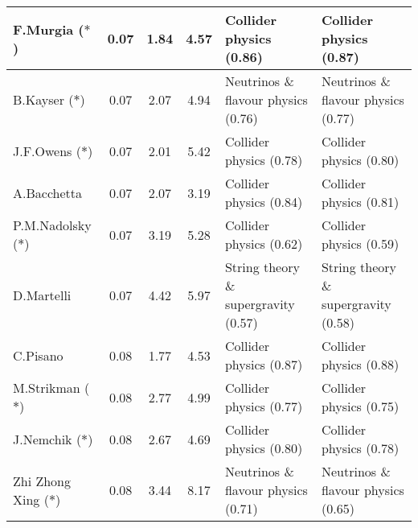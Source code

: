 \begin{table}[H]
\begin{tabular}{p{}|c|c|c|b{}|b{}}
      F.Murgia ($\ast$) &  0.07 &          1.84 &          4.57 &              Collider physics (0.86) &              Collider physics (0.87)\\ \hline
      B.Kayser ($\ast$) &  0.07 &          2.07 &          4.94 &  Neutrinos \& flavour physics (0.76) &  Neutrinos \& flavour physics (0.77)\\ \hline
     J.F.Owens ($\ast$) &  0.07 &          2.01 &          5.42 &              Collider physics (0.78) &              Collider physics (0.80)\\ \hline
            A.Bacchetta &  0.07 &          2.07 &          3.19 &              Collider physics (0.84) &              Collider physics (0.81)\\ \hline
  P.M.Nadolsky ($\ast$) &  0.07 &          3.19 &          5.28 &              Collider physics (0.62) &              Collider physics (0.59)\\ \hline
             D.Martelli &  0.07 &          4.42 &          5.97 & String theory \& supergravity (0.57) & String theory \& supergravity (0.58)\\ \hline
               C.Pisano &  0.08 &          1.77 &          4.53 &              Collider physics (0.87) &              Collider physics (0.88)\\ \hline
    M.Strikman ($\ast$) &  0.08 &          2.77 &          4.99 &              Collider physics (0.77) &              Collider physics (0.75)\\ \hline
     J.Nemchik ($\ast$) &  0.08 &          2.67 &          4.69 &              Collider physics (0.80) &              Collider physics (0.78)\\ \hline
Zhi Zhong Xing ($\ast$) &  0.08 &          3.44 &          8.17 &  Neutrinos \& flavour physics (0.71) &  Neutrinos \& flavour physics (0.65)\\ \hline
\bottomrule
\end{tabular}
\end{table}
